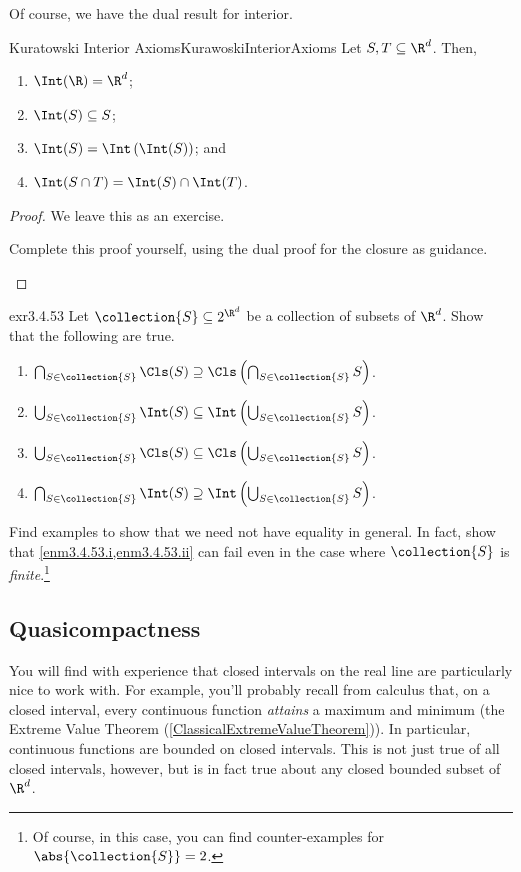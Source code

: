 Of course, we have the dual result for interior.
\begin{thm}{Kuratowski Interior Axioms}{KurawoskiInteriorAxioms}
Let $S,T\subseteq \R ^d$.  Then,
\begin{enumerate}
\item $\Int (\R )=\R ^d$;
\item $\Int (S)\subseteq S$;
\item $\Int (S)=\Int \left( \Int (S)\right)$; and
\item $\Int (S\cap T)=\Int (S)\cap \Int (T)$.
\end{enumerate}
\begin{proof}
We leave this as an exercise.
\begin{exr}{}{}
Complete this proof yourself, using the dual proof for the closure as guidance.
\end{exr}
\end{proof}
\end{thm}
\begin{exr}{}{exr3.4.53}
Let $\collection{S}\subseteq 2^{\R ^d}$ be a collection of subsets of $\R ^d$.  Show that the following are true.
\begin{enumerate}
\item \label{enm3.4.53.i}$\bigcap _{S\in \collection{S}}\Cls (S)\supseteq \Cls \left( \bigcap _{S\in \collection{S}}S\right)$.
\item \label{enm3.4.53.ii}$\bigcup _{S\in \collection{S}}\Int (S)\subseteq \Int \left( \bigcup _{S\in \collection{S}}S\right) $.
\item \label{enm3.4.53.iii}$\bigcup _{S\in \collection{S}}\Cls (S)\subseteq \Cls \left( \bigcup _{S\in \collection{S}}S\right)$.
\item \label{enm3.4.53.iv}$\bigcap _{S\in \collection{S}}\Int (S)\supseteq \Int \left( \bigcup _{S\in \collection{S}}S\right)$.
\end{enumerate}
Find examples to show that we need not have equality in general.  In fact, show that \cref{enm3.4.53.i,enm3.4.53.ii} can fail even in the case where $\collection{S}$ is \emph{finite}.\footnote{Of course, in this case, you can find counter-examples for $\abs{\collection{S}}=2$.}
\end{exr}

\subsection{Quasicompactness}

You will find with experience that closed intervals on the real line are particularly nice to work with.  For example, you'll probably recall from calculus that, on a closed interval, every continuous function \emph{attains} a maximum and minimum (the Extreme Value Theorem (\cref{ClassicalExtremeValueTheorem})).  In particular, continuous functions are bounded on closed intervals.  This is not just true of all closed intervals, however, but is in fact true about any closed bounded subset of $\R ^d$.

